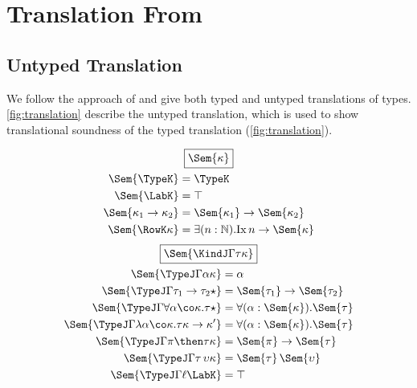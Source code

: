 \documentclass[authoryear,acmsmall,screen]{acmart}
\newcommand\Nat{\mathbb{N}}
\newcommand\Ix[1]{\mathrm{Ix} \, #1}
\newcommand\Ixed[1]{\ensuremath{\Sem{#1}}}
\begin{document}
\section{Translation From \RO}

\subsection{Untyped Translation}

We follow the approach of \cite{MorrisM19} and give both typed and untyped translations of \RO types. \cref{fig:translation} describe the untyped translation, which is used to show translational soundness of the typed translation (\cref{fig:translation}).


\begin{figure}[H]
\begin{gather*}
\fbox{$\Ixed{\kappa}$} \\
\begin{align*}
\vspace{5em}
\Ixed{\TypeK} &= \TypeK \\
\Ixed{\LabK} &= \top \\
\Ixed{\kappa_1 \to \kappa_2} &= \Ixed{\kappa_1} \to \Ixed{\kappa_2} \\
\Ixed{\RowK \kappa} &= \exists(n : \Nat). \Ix  n \to \Ixed{\kappa} \\
\end{align*}
\end{gather*}
\begin{gather*}
\fbox{$\Ixed{\KindJ \Gamma \tau \kappa}$} \\
\begin{align*}
\vspace{5em}
\Ixed{\TypeJ \Gamma \alpha \kappa} &= \alpha \\
\Ixed{\TypeJ \Gamma {\tau_1 \to \tau_2} \star} &= \Ixed{\tau_1} \to \Ixed{\tau_2} \\
\Ixed{\TypeJ \Gamma {\forall \alpha \co \kappa. \tau} \star} &= \forall (\alpha : \Ixed{\kappa}).\Ixed{\tau} \\
\Ixed{\TypeJ \Gamma {\lambda \alpha \co \kappa. \tau} {\kappa \to \kappa'}} &= \forall (\alpha : \Ixed{\kappa}).\Ixed{\tau} \\
\Ixed{\TypeJ \Gamma {\pi \then \tau} \kappa} &= \Ixed{\pi} \to \Ixed{\tau} \\
\Ixed{\TypeJ \Gamma {\tau \, \upsilon} \kappa} &= \Ixed{\tau} \, \Ixed{\upsilon} \\
\Ixed{\TypeJ \Gamma \ell {\LabK}} &= \top  \\

\end{align*}
\end{gather*}
\end{figure}
\end{document}
